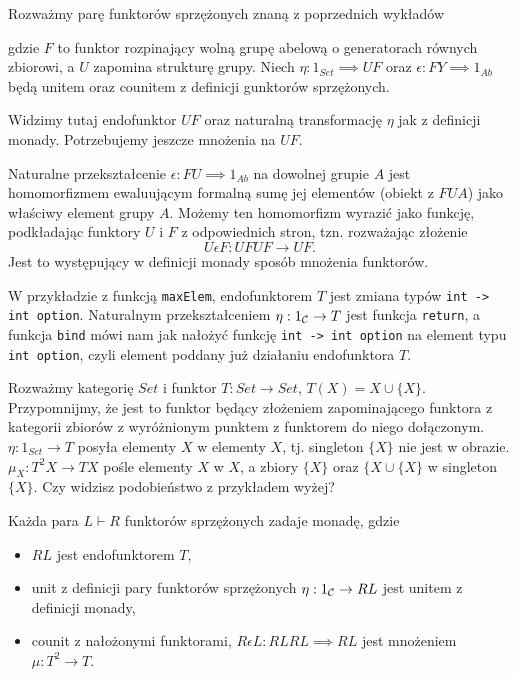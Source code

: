 \begin{example}[m]
  \item Rozważmy parę funktorów sprzężonych znaną z poprzednich wykładów
  \begin{center}
  \end{center}
  gdzie $F$ to funktor rozpinający wolną grupę abelową o generatorach równych zbiorowi, a $U$ zapomina strukturę grupy. Niech $\eta:1_{Set}\implies UF$ oraz $\epsilon:FY\implies 1_{Ab}$ będą unitem oraz counitem z definicji gunktorów sprzężonych.

  Widzimy tutaj endofunktor $UF$ oraz naturalną transformację $\eta$ jak z definicji monady. Potrzebujemy jeszcze mnożenia na $UF$.

  Naturalne przekształcenie $\epsilon:FU\implies 1_{Ab}$ na dowolnej grupie $A$ jest homomorfizmem ewaluującym formalną sumę jej elementów (obiekt z $FUA$) jako właściwy element grupy $A$. Możemy ten homomorfizm wyrazić jako funkcję, podkładając funktory $U$ i $F$ z odpowiednich stron, tzn. rozważając złożenie
  $$U\epsilon F:UFUF\to UF.$$
  Jest to występujący w definicji monady sposób mnożenia funktorów.
\item W przykładzie z funkcją \lstinline{maxElem}, endofunktorem $T$ jest zmiana typów \lstinline{int -> int option}. Naturalnym przekształceniem $\eta:1_{\mathcal{C}}\to T$ jest funkcja \lstinline{return}, a funkcja \lstinline{bind} mówi nam jak nałożyć funkcję \lstinline{int -> int option} na element typu \lstinline{int option}, czyli element poddany już działaniu endofunktora $T$.
\item Rozważmy kategorię $Set$ i funktor $T:Set\to Set$, $T(X)=X\cup\{X\}$. Przypomnijmy, że jest to funktor będący złożeniem zapominającego funktora z kategorii zbiorów z wyróżnionym punktem z funktorem do niego dołączonym. $\eta:1_{Set}\to T$ posyła elementy $X$ w elementy $X$, tj. singleton $\{X\}$ nie jest w obrazie. $\mu_X:T^2X\to TX$ pośle elementy $X$ w $X$, a zbiory $\{X\}$ oraz $\{X\cup\{X\}$ w singleton $\{X\}$. Czy widzisz podobieństwo z przykładem wyżej? 
\end{example}

\begin{lemma}{}{}
  Każda para $L\vdash R$ funktorów sprzężonych zadaje monadę, gdzie
  \begin{itemize}
    \item $RL$ jest endofunktorem $T$,
    \item unit z definicji pary funktorów sprzężonych $\eta:1_{\mathcal{C}}\to RL$ jest unitem z definicji monady,
    \item counit z nałożonymi funktorami, $R\epsilon L:RLRL\implies RL$ jest mnożeniem $\mu:T^2\to T$.
  \end{itemize}
\end{lemma}

